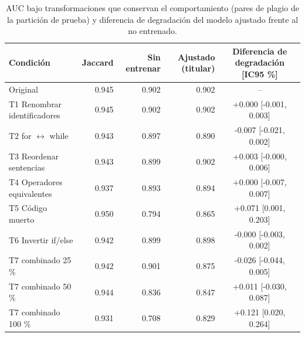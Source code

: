 \begin{table}[H]
\centering
\small
\begin{tabular}{|l|r|r|r|c|}
\hline
\textbf{Condición} & \textbf{Jaccard} & \textbf{Sin entrenar} & \textbf{Ajustado (titular)} & \textbf{Diferencia de degradación [IC95 \%]} \\ \hline
Original & 0.945 & 0.902 & 0.902 & -- \\ \hline
T1 Renombrar identificadores & 0.945 & 0.902 & 0.902 & +0.000 [-0.001, 0.003] \\ \hline
T2 for $\leftrightarrow$ while & 0.943 & 0.897 & 0.890 & -0.007 [-0.021, 0.002] \\ \hline
T3 Reordenar sentencias & 0.943 & 0.899 & 0.902 & +0.003 [-0.000, 0.006] \\ \hline
T4 Operadores equivalentes & 0.937 & 0.893 & 0.894 & +0.000 [-0.007, 0.007] \\ \hline
T5 Código muerto & 0.950 & 0.794 & 0.865 & +0.071 [0.001, 0.203] \\ \hline
T6 Invertir if/else & 0.942 & 0.899 & 0.898 & -0.000 [-0.003, 0.002] \\ \hline
T7 combinado 25 \% & 0.942 & 0.901 & 0.875 & -0.026 [-0.044, 0.005] \\ \hline
T7 combinado 50 \% & 0.944 & 0.836 & 0.847 & +0.011 [-0.030, 0.087] \\ \hline
T7 combinado 100 \% & 0.931 & 0.708 & 0.829 & +0.121 [0.020, 0.264] \\ \hline
\end{tabular}
\caption{AUC bajo transformaciones que conservan el comportamiento (pares de plagio de la partición de prueba) y diferencia de degradación del modelo ajustado frente al no entrenado.}
\label{tab:robustez_auc}
\end{table}
